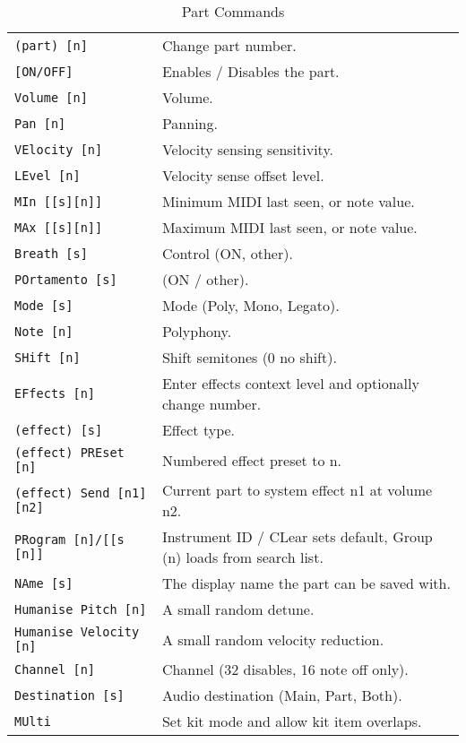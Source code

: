    \begin{table}[H]
      \centering
      \caption{Part Commands}
      \label{table:yoshimi_part_commands}
      \begin{tabular}{l l}
\texttt{(part) [n]} &
   Change part number.  \\
\texttt{[ON/OFF]} &
   Enables / Disables the part. \\
\texttt{Volume [n]} &
   Volume.  \\
\texttt{Pan [n]} &
   Panning.\\
\texttt{VElocity [n]} &
   Velocity sensing sensitivity. \\
\texttt{LEvel [n]} &
   Velocity sense offset level.  \\
\texttt{MIn [[s][n]]} &
   Minimum MIDI last seen, or note value.   \\
\texttt{MAx [[s][n]]} &
   Maximum MIDI last seen, or note value.   \\
\texttt{Breath [s]} &
   Control (ON, {other}).  \\
\texttt{POrtamento [s]} &
   (ON / other).   \\
\texttt{Mode [s]} &
   Mode (Poly, Mono, Legato). \\
\texttt{Note [n]} &
   Polyphony.  \\
\texttt{SHift [n]} &
   Shift semitones (0 no shift). \\
\texttt{EFfects [n]} &
   Enter effects context level and optionally change number.  \\
 \texttt{(effect) [s]} &
   Effect type.   \\
 \texttt{(effect) PREset [n]} &
   Numbered effect preset to n. \\
 \texttt{(effect) Send [n1] [n2]} &
   Current part to system effect n1 at volume n2. \\
\texttt{PRogram [n]/[[s [n]]} &
   Instrument ID / CLear sets default, Group (n) loads from search list. \\
\texttt{NAme [s]} &
   The display name the part can be saved with. \\
\texttt{Humanise Pitch [n]} &
   A small random detune. \\
\texttt{Humanise Velocity [n]} &
   A small random velocity reduction. \\
\texttt{Channel [n]} &
   Channel (32 disables, 16 note off only).   \\
\texttt{Destination [s]} &
   Audio destination (Main, Part, Both).  \\
\texttt{MUlti} &
   Set kit mode and allow kit item overlaps. \\

\end{tabular}
\end{table}
